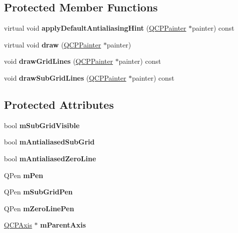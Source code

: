 \subsection*{Protected Member Functions}
\begin{DoxyCompactItemize}
\item 
\hypertarget{class_q_c_p_grid_ac5d2c0a3b6212ce1c2c19f5a6df586e5}{}\label{class_q_c_p_grid_ac5d2c0a3b6212ce1c2c19f5a6df586e5} 
virtual void {\bfseries apply\+Default\+Antialiasing\+Hint} (\hyperlink{class_q_c_p_painter}{Q\+C\+P\+Painter} $\ast$painter) const
\item 
\hypertarget{class_q_c_p_grid_ad009c23f96078616aa4f66a750974b23}{}\label{class_q_c_p_grid_ad009c23f96078616aa4f66a750974b23} 
virtual void {\bfseries draw} (\hyperlink{class_q_c_p_painter}{Q\+C\+P\+Painter} $\ast$painter)
\item 
\hypertarget{class_q_c_p_grid_aee4e95d54acabbe298d6dda0dd86c0a4}{}\label{class_q_c_p_grid_aee4e95d54acabbe298d6dda0dd86c0a4} 
void {\bfseries draw\+Grid\+Lines} (\hyperlink{class_q_c_p_painter}{Q\+C\+P\+Painter} $\ast$painter) const
\item 
\hypertarget{class_q_c_p_grid_a751ce8aef815bcc9193432a30c8b6b6e}{}\label{class_q_c_p_grid_a751ce8aef815bcc9193432a30c8b6b6e} 
void {\bfseries draw\+Sub\+Grid\+Lines} (\hyperlink{class_q_c_p_painter}{Q\+C\+P\+Painter} $\ast$painter) const
\end{DoxyCompactItemize}
\subsection*{Protected Attributes}
\begin{DoxyCompactItemize}
\item 
\hypertarget{class_q_c_p_grid_a4e4a0400d6319bb44c06341f6298c87b}{}\label{class_q_c_p_grid_a4e4a0400d6319bb44c06341f6298c87b} 
bool {\bfseries m\+Sub\+Grid\+Visible}
\item 
\hypertarget{class_q_c_p_grid_a71b7051f833f0c5de3094998d6afdd87}{}\label{class_q_c_p_grid_a71b7051f833f0c5de3094998d6afdd87} 
bool {\bfseries m\+Antialiased\+Sub\+Grid}
\item 
\hypertarget{class_q_c_p_grid_a8c0df56ae86440408c050895dcdb922b}{}\label{class_q_c_p_grid_a8c0df56ae86440408c050895dcdb922b} 
bool {\bfseries m\+Antialiased\+Zero\+Line}
\item 
\hypertarget{class_q_c_p_grid_a1cdc4a3bccf6a40c2d4360def9fefa40}{}\label{class_q_c_p_grid_a1cdc4a3bccf6a40c2d4360def9fefa40} 
Q\+Pen {\bfseries m\+Pen}
\item 
\hypertarget{class_q_c_p_grid_aa9004bc139ad3ea92629f0aaae81d83f}{}\label{class_q_c_p_grid_aa9004bc139ad3ea92629f0aaae81d83f} 
Q\+Pen {\bfseries m\+Sub\+Grid\+Pen}
\item 
\hypertarget{class_q_c_p_grid_a379481871f17655c27eda30af233554f}{}\label{class_q_c_p_grid_a379481871f17655c27eda30af233554f} 
Q\+Pen {\bfseries m\+Zero\+Line\+Pen}
\item 
\hypertarget{class_q_c_p_grid_a9a8a76731e6e737b65b929fd1995cc88}{}\label{class_q_c_p_grid_a9a8a76731e6e737b65b929fd1995cc88} 
\hyperlink{class_q_c_p_axis}{Q\+C\+P\+Axis} $\ast$ {\bfseries m\+Parent\+Axis}
\end{DoxyCompactItemize}
